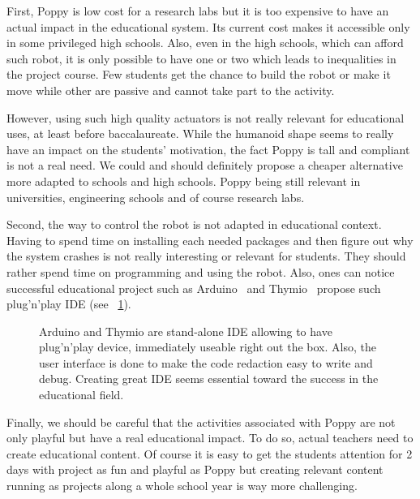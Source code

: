 First, Poppy is low cost for a research labs but it is too expensive to have an actual impact in the educational system. Its current cost makes it accessible only in some privileged high schools. Also, even in the high schools, which can afford such robot, it is only possible to have one or two which leads to inequalities in the project course. Few students get the chance to build the robot or make it move while other are passive and cannot take part to the activity.

However, using such high quality actuators is not really relevant for educational uses, at least before baccalaureate. While the humanoid shape seems to really have an impact on the students’ motivation, the fact Poppy is tall and compliant is not a real need. We could and should definitely propose a cheaper alternative more adapted to schools and high schools. Poppy being still relevant in universities, engineering schools and of course research labs.

Second, the way to control the robot is not adapted in educational context. Having to spend time on installing each needed packages and then figure out why the system crashes is not really interesting or relevant for students. They should rather spend time on programming and using the robot. Also, ones can notice successful educational project such as Arduino~\cite{banzi2009getting} and Thymio~\cite{shin2014visual}  propose such plug'n'play IDE (see \figurename~\ref{fig:eductationnal IDE}).

\begin{figure}[tb]
\centering
    \hfil
    \caption{Arduino and Thymio are stand-alone IDE allowing to have plug'n'play device, immediately useable right out the box. Also, the user interface is done to make the code redaction easy to write and debug. Creating great IDE seems essential toward the success in the educational field.}
    \label{fig:eductationnal IDE}
\end{figure}


Finally, we should be careful that the activities associated with Poppy are not only playful but have a real educational impact. To do so, actual teachers need to create educational content. Of course it is easy to get the students attention for 2 days with project as fun and playful as Poppy but creating relevant content running as projects along a whole school year is way more challenging.

